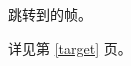 \documentclass{ctexbeamer}
\begin{document}
    \begin{frame}[label=target]
        跳转到的帧。
    \end{frame}
    \begin{frame}
        详见第 \ref{target} 页。
    \end{frame}
\end{document}
